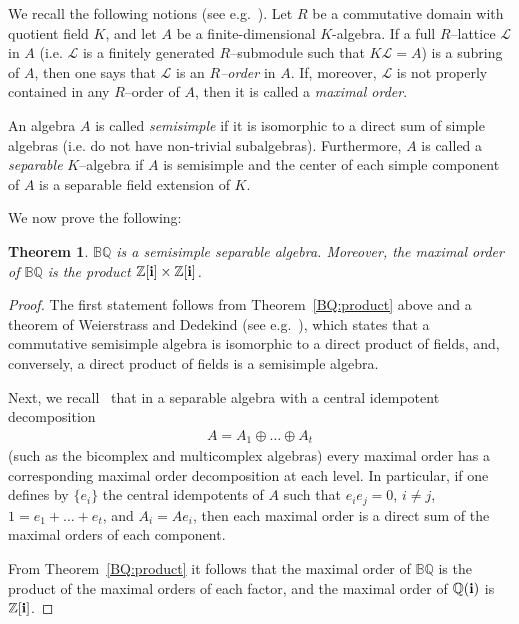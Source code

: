 \documentclass[reqno]{amsart}
\theoremstyle{plain}
\newtheorem{theorem}{Theorem}[section]
\theoremstyle{definition}
\theoremstyle{remark}
\numberwithin{equation}{section}
\begin{document}
We recall the following notions (see e.g.~\cite{reiner}). Let $R$ be a
commutative domain with quotient field $K$, and let $A$ be a
finite-dimensional $K$-algebra.  If a full $R$--lattice ${{\mathcal L}}$ in $A$
(i.e. ${{\mathcal L}}$ is a finitely generated $R$--submodule such that
$K{{\mathcal L}} =A$) is a subring of $A$, then one says that ${{\mathcal L}}$ is an
{\em $R$--order} in $A$. If, moreover, ${{\mathcal L}}$ is not properly
contained in any $R$--order of $A$, then it is called a {\em maximal
  order}.

An algebra $A$ is called {\em semisimple} if it is isomorphic to a
direct sum of simple algebras (i.e. do not have non-trivial
subalgebras).  Furthermore, $A$ is called a {\em separable}
$K$--algebra if $A$ is semisimple and the center of each simple
component of $A$ is a separable field extension of $K$.

We now prove the following:
\begin{theorem}
  \label{thm:BQ}
  ${{\mathbb B}{\mathbb Q}}$ is a semisimple separable algebra. Moreover, the maximal order
  of ${{\mathbb B}{\mathbb Q}}$ is the product ${{\mathbb Z}}[{{\bf i}}]\times{{\mathbb Z}}[{{\bf i}}]$.
\end{theorem}
\begin{proof}
  The first statement follows from Theorem~\ref{BQ:product} above and
  a theorem of Weierstrass and Dedekind (see e.g.~\cite[Theorem 2.4.1
  (pp. 38)]{drozd}), which states that a commutative semisimple
  algebra is isomorphic to a direct product of fields, and,
  conversely, a direct product of fields is a semisimple algebra.

  Next, we recall~\cite[Theorem 10.5]{reiner} that in a separable
  algebra with a central idempotent decomposition
  \begin{align*}
    A = A_1 \oplus \dots \oplus A_t
  \end{align*}
  (such as the bicomplex and multicomplex algebras) every maximal
  order has a corresponding maximal order decomposition at each
  level. In particular, if one defines by $\{e_i\}$ the central
  idempotents of $A$ such that $e_ie_j=0$, $i\neq j$,
  $1= e_1 + \dots + e_t$, and $A_i=Ae_i$, then each maximal order is a
  direct sum of the maximal orders of each component.

  From Theorem~\ref{BQ:product} it follows that the maximal order of
  ${{\mathbb B}{\mathbb Q}}$ is the product of the maximal orders of each factor, and the
  maximal order of ${{\mathbb Q}}({{\bf i}})$ is ${{\mathbb Z}}[{{\bf i}}]$.
\end{proof}
\end{document}
